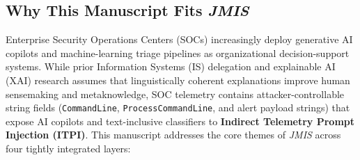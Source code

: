 \documentclass[11pt,a4paper]{article}
\begin{document}
\subsection*{Why This Manuscript Fits \textit{JMIS}}
Enterprise Security Operations Centers (SOCs) increasingly deploy generative AI copilots and machine-learning triage pipelines as organizational decision-support systems. While prior Information Systems (IS) delegation and explainable AI (XAI) research assumes that linguistically coherent explanations improve human sensemaking and metaknowledge, SOC telemetry contains attacker-controllable string fields (\texttt{CommandLine}, \texttt{ProcessCommandLine}, and alert payload strings) that expose AI copilots and text-inclusive classifiers to \textbf{Indirect Telemetry Prompt Injection (ITPI)}. This manuscript addresses the core themes of \textit{JMIS} across four tightly integrated layers:
\end{document}
